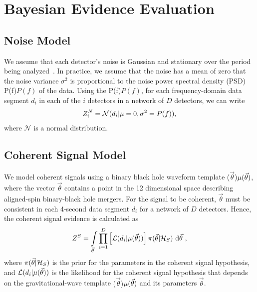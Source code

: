 \documentclass[%
 nofootinbib,
 amsmath,amssymb,
 aps,
 twocolumn,
 superscriptaddress
]{revtex4-2}
\newcommand{\mathcmd}[1]{{\sc \relax\ifmmode#1\else $#1$\fi}\xspace}
\newcommand{\psd}{\mathcmd{P(f)}}
\newcommand{\parameters}{\mathcmd{\vec{\theta}}}
\newcommand{\template}{\mathcmd{\mu(\parameters)}}
\begin{document}
\appendix



\section{Bayesian Evidence Evaluation}\label{sec:bayesianEvidEval}
\subsection{Noise Model}
We assume that each detector's noise is Gaussian and stationary over the period being analyzed~\cite{ligo_psd}. In practice, we assume that the noise has a mean of zero that the noise variance $\sigma^2$ is proportional to the noise power spectral density (PSD) \psd of the data. Using the \psd, for each frequency-domain data segment $d_i$ in each of the $i$ detectors in a network of $D$ detectors, we can write 
\begin{equation}
\label{eq:zn}
Z^N_i = \mathcal{N}(d_i|\mu=0,\sigma^2=\psd),
\end{equation}
where $\mathcal{N}$ is a normal distribution. 

\subsection{Coherent Signal Model}
We model coherent signals using a binary black hole waveform template \template, where the vector \parameters contains a point in the 12 dimensional space describing aligned-spin binary-black hole mergers. For the signal to be coherent, \parameters must be consistent in each 4-second data segment $d_i$ for a network of $D$ detectors. Hence, the coherent signal evidence is calculated as
\begin{equation}
\label{eq:zs}
Z^S = \int\limits_{\parameters} \prod\limits^{D}_{i=1} \left[ \mathcal{L}(d_i|\template)\right] \pi(\parameters | \mathcal{H}_S)\  \text{d}\parameters \ ,
\end{equation}
where $\pi(\parameters| \mathcal{H}_S)$ is the prior for the parameters in the coherent signal hypothesis, and $\mathcal{L}(d_i|\template)$ is the likelihood for the coherent signal hypothesis that depends on the gravitational-wave template \template and its parameters \parameters. 
\end{document}
